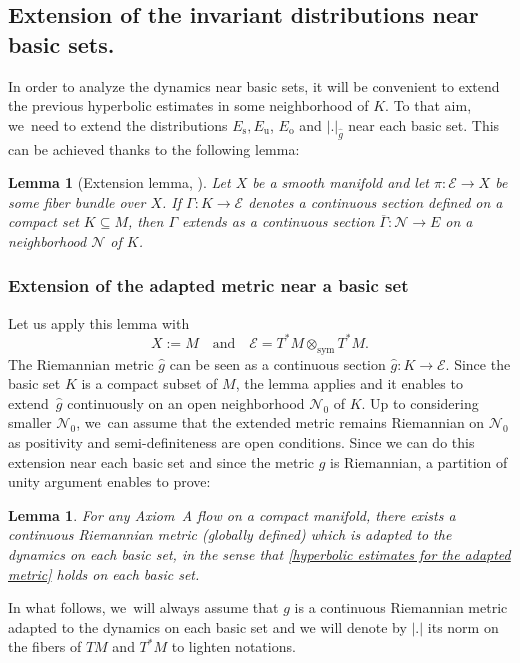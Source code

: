 \documentclass[JEP,XML,SOM,Unicode,NoEqCountersInSection,NoFloatCountersInSection,published]{cedram}
\newcommand{\ro}{\mathrm{o}}
\newcommand{\rs}{\mathrm{s}}
\newcommand{\ru}{\mathrm{u}}
\newcommand{\sym}{\mathrm{sym}}
\theoremstyle{definition}
\theoremstyle{plain}
\newtheorem{lemma}[definition]{Lemma}
\newcommand{\Ecal}{\mathcal{E}}
\newcommand{\Ncal}{\mathcal{N}}
\begin{document}
\subsection{Extension of the invariant distributions near basic sets.}

In order to analyze the dynamics near basic sets, it will be convenient to extend the previous hyperbolic estimates in some neighborhood of $K$. To that aim, we~need to extend the distributions $E_\rs, E_\ru$, $E_\ro$ and $|.|_{\hat{g}}$ near each basic set. This can be achieved thanks to the following lemma:

\begin{lemma}[{Extension lemma, \cite[Lem.\,4.4 p.\,128]{HPPS}}]\label{Lemme geometrique prolongement des sections} Let $X$ be a smooth manifold and let $\pi: \Ecal \to X$ be some fiber bundle over $X$. If $\Gamma: K \to \Ecal$ denotes a continuous section defined on a compact set $K \subseteq M$, then $\Gamma$ extends as a continuous section $\overline{\Gamma}: \Ncal \to E$ on a neighborhood $\Ncal$ of $K$.
\end{lemma}

\subsubsection{Extension of the adapted metric near a basic set} Let us apply this lemma with
\[
X:= M \quad \text{and} \quad \Ecal = T^* M \otimes_{\sym} T^* M.
\]
The Riemannian metric $\hat{g}$ can be seen as a continuous section $\hat{g}: K \to \Ecal$. Since the basic set $K$ is a compact subset of $M$, the lemma applies and it enables to extend~$\hat{g}$ continuously on an open neighborhood $\Ncal_0$ of $K$. Up to considering smaller $\Ncal_0$, we~can assume that the extended metric remains Riemannian on $\Ncal_0$ as positivity and semi-definiteness are open conditions. Since we can do this extension near each basic set and since the metric $g$ is Riemannian, a partition of unity argument enables to prove:

\begin{lemma}
For any Axiom~A flow on a compact manifold, there exists a continuous Riemannian metric (globally defined) which is adapted to the dynamics on each basic set, in the sense that \eqref{hyperbolic estimates for the adapted metric} holds on each basic set.
\end{lemma}

In what follows, we~will always assume that $g$ is a continuous Riemannian metric adapted to the dynamics on each basic set and we will denote by $|.|$ its norm on the fibers of $TM$ and $T^* M$ to lighten notations.
\end{document}
